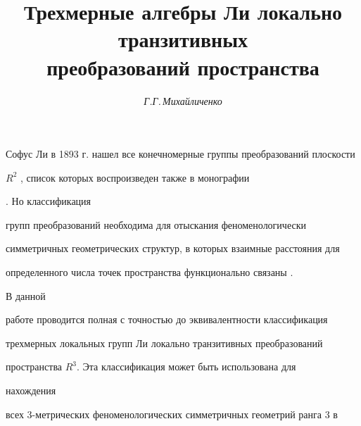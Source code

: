 

\author{\it Г.Г.\,Михайличенко} 


\title{Трехмерные алгебры Ли локально транзитивных\\ 


преобразований пространства} 


 


\date{} 




 


\pagestyle{plain} %


 


 




 


\maketitle 


 




 


Софус Ли в 1893 г. нашел все конечномерные группы преобразований плоскости 


$R^2$ \cite{Lie}, список которых воспроизведен также в монографии 


\cite{Vla}. Но классификация 


групп преобразований необходима для отыскания феноменологически 


симметричных геометрических структур, в которых взаимные расстояния для 


определенного числа точек пространства функционально связаны \cite{Mih}. 


В данной 


работе проводится полная с точностью до эквивалентности классификация 


трехмерных локальных групп Ли локально транзитивных преобразований 


пространства $R^3$. Эта классификация может быть использована для 


нахождения 


всех 3-метрических феноменологических симметричных геометрий ранга 3 в 


